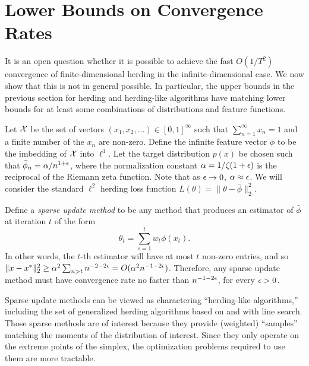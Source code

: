 \documentclass[paper.tex]{subfiles}
\begin{document}
\section{Lower Bounds on Convergence Rates}
\label{sec:lower-bounds}

It is an open question whether it is possible to achieve the fast $O(1/T^{2})$ convergence of finite-dimensional herding in the infinite-dimensional case. We now show that this is not in general possible. In particular, the upper bounds in the previous section for herding and herding-like algorithms have matching lower bounds for at least some combinations of distributions and feature functions. 

Let $\mathcal{X}$ be the set of vectors $(x_{1},x_{2},\dots) \in [0,1]^{\infty}$ such that $\sum_{n=1}^{\infty} x_{n} = 1$ and a finite number of the $x_{n}$ are non-zero. Define the infinite feature vector $\phi$ to be the imbedding of $\mathcal{X}$ into $\ell^{1}$. Let the target distribution $p(x)$ be chosen such that $\bar\phi_{n} = \alpha/n^{1+\epsilon}$, where the normalization constant $\alpha = 1/\zeta(1 + \epsilon)$ is the reciprocal of the Riemann zeta function. Note that as $\epsilon \to 0$, $\alpha \approx \epsilon$. We will consider the standard $\ell^{2}$ herding loss function $L(\theta) = \|\theta - \bar \phi\|_2^2$. 

Define a {\em sparse update method} to be any method that produces an estimator of $\bar \phi$ at iteration $t$ of the form 
\[
\theta_{t} = \sum_{s =1}^{t}w_{t} \phi(x_{t}).
\]
In other words, the $t$-th estimator will have at most $t$ non-zero entries, and so $\|x-x^{*}\|_2^2 \ge \alpha^{2}\sum_{n > t} n^{-2-2\epsilon} = O(\alpha^{2}n^{-1-2\epsilon})$. Therefore, any sparse update method must have convergence rate no faster than $n^{-1-2\epsilon}$, for every $\epsilon > 0$. 

Sparse update methods can be viewed as charactering ``herding-like algorithms,'' including the set of generalized herding algorithms based on \dual and \cgd with line search. Those sparse methods are of interest because they provide (weighted) ``samples'' matching the moments of the distribution of interest. Since they only operate on the extreme points of the simplex, the optimization problems required to use them are more tractable. 
\end{document}
